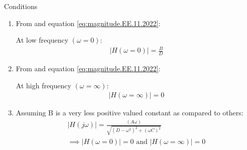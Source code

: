 \documentclass[journal,12pt,twocolumn]{IEEEtran}
\theoremstyle{remark}
\begin{document}
\begin{table}[htbp]
\setlength{\extrarowheight}{4pt}
\setlength{\tabcolsep}{3pt}
\centering

\caption{Conditions}
\label{tab:inputs.EE.11.2022}
\end{table}
\begin{enumerate}[label=(\roman*)]
\item \noindent From  and equation \eqref{eq:magnitude.EE.11.2022}:

 \noindent At low frequency $(\omega = 0 )$:
 \begin{align}
     |H(\omega = 0)| = \frac{B}{D}\label{eq:lowpass.EE.11.2022}
 \end{align}

\item \noindent From  and equation \eqref{eq:magnitude.EE.11.2022}:

 \noindent At high frequency $(\omega = \infty )$:
 \begin{align}
     |H(\omega = \infty)| = 0 \label{eq:highpass.EE.11.2022}
 \end{align}
\item Assuming B is a very less positive valued constant as compared to others:
\begin{align}
        |H(j\omega)| = \frac{(A\omega)}{\sqrt{(D - \omega^2)^2 + (\omega C)^2}}\\
   \implies      |H(\omega = 0)| = 0 \text{ and }  |H(\omega = \infty)| = 0 \label{eq:bandpass.EE.11.2022}
\end{align}

\end{enumerate}
\end{document}
